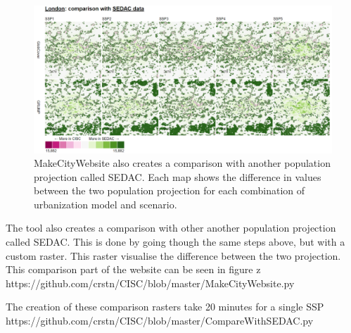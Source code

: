 \begin{figure} [H]
	\centering
	\includegraphics[width=.8\textwidth]{Pictures/MakeCityWebsite2}
	\caption{MakeCityWebsite also creates a comparison with another population projection called SEDAC. Each map shows the difference in values between the two population projection for each combination of urbanization model and scenario.}
	\label{MakeCityWebsite1}
\end{figure}

The tool also creates a comparison with other another population projection called SEDAC. This is done by going though the same steps above, but with a custom raster. This raster visualise the difference between the two projection. This comparison part of the website can be seen in figure z
https://github.com/crstn/CISC/blob/master/MakeCityWebsite.py

The creation of these comparison rasters take 20 minutes for a single SSP
https://github.com/crstn/CISC/blob/master/CompareWithSEDAC.py





